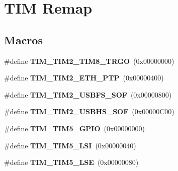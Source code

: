 \hypertarget{group___t_i_m_ex___remap}{}\section{T\+IM Remap}
\label{group___t_i_m_ex___remap}
\subsection*{Macros}
\begin{DoxyCompactItemize}
\item 
\#define {\bfseries T\+I\+M\+\_\+\+T\+I\+M2\+\_\+\+T\+I\+M8\+\_\+\+T\+R\+GO}~(0x00000000)\hypertarget{group___t_i_m_ex___remap_ga3dbfe224567e0b568859a4c749c83d1c}{}\label{group___t_i_m_ex___remap_ga3dbfe224567e0b568859a4c749c83d1c}

\item 
\#define {\bfseries T\+I\+M\+\_\+\+T\+I\+M2\+\_\+\+E\+T\+H\+\_\+\+P\+TP}~(0x00000400)\hypertarget{group___t_i_m_ex___remap_ga63b5bc00517eecfa1dbf6b7d7cf56135}{}\label{group___t_i_m_ex___remap_ga63b5bc00517eecfa1dbf6b7d7cf56135}

\item 
\#define {\bfseries T\+I\+M\+\_\+\+T\+I\+M2\+\_\+\+U\+S\+B\+F\+S\+\_\+\+S\+OF}~(0x00000800)\hypertarget{group___t_i_m_ex___remap_ga263984d585fd682730d3199da47dd803}{}\label{group___t_i_m_ex___remap_ga263984d585fd682730d3199da47dd803}

\item 
\#define {\bfseries T\+I\+M\+\_\+\+T\+I\+M2\+\_\+\+U\+S\+B\+H\+S\+\_\+\+S\+OF}~(0x00000\+C00)\hypertarget{group___t_i_m_ex___remap_ga8e47d56e9e9c9583b85a4c7b9f98931a}{}\label{group___t_i_m_ex___remap_ga8e47d56e9e9c9583b85a4c7b9f98931a}

\item 
\#define {\bfseries T\+I\+M\+\_\+\+T\+I\+M5\+\_\+\+G\+P\+IO}~(0x00000000)\hypertarget{group___t_i_m_ex___remap_ga8525d77a5f6fea05530e812e991e4d6d}{}\label{group___t_i_m_ex___remap_ga8525d77a5f6fea05530e812e991e4d6d}

\item 
\#define {\bfseries T\+I\+M\+\_\+\+T\+I\+M5\+\_\+\+L\+SI}~(0x00000040)\hypertarget{group___t_i_m_ex___remap_ga62000fc12a4ed5909723b881533a2f93}{}\label{group___t_i_m_ex___remap_ga62000fc12a4ed5909723b881533a2f93}

\item 
\#define {\bfseries T\+I\+M\+\_\+\+T\+I\+M5\+\_\+\+L\+SE}~(0x00000080)\hypertarget{group___t_i_m_ex___remap_ga9f09de021d2f68730c952b4f0ebb82bc}{}\label{group___t_i_m_ex___remap_ga9f09de021d2f68730c952b4f0ebb82bc}


\end{DoxyCompactItemize}
